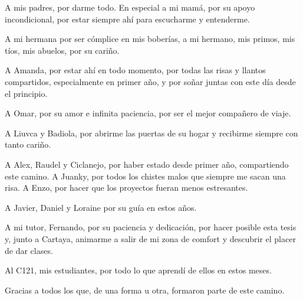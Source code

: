 \begin{acknowledgements}
    A mis padres, por darme todo. En especial a mi mamá, por su apoyo incondicional, por estar siempre ahí para escucharme y entenderme. 
    
    A mi hermana por ser cómplice en mis boberías, a mi hermano, mis primos, mis tíos, mis abuelos, por su cariño.

    A Amanda, por estar ahí en todo momento, por todas las risas y llantos compartidos, especialmente en primer año, y por soñar juntas con este día desde el principio.  

    A Omar, por su amor e infinita paciencia, por ser el mejor compañero de viaje. 
    
    A Liuvca y Badiola, por abrirme las puertas de su hogar y recibirme siempre con tanto cariño.

    A Alex, Raudel y Ciclanejo, por haber estado desde primer año, compartiendo este camino. A Juanky, por todos los chistes malos que siempre me sacan una risa. A Enzo, por hacer que los proyectos fueran menos estresantes.

    A Javier, Daniel y Loraine por su guía en estos años.

    A mi tutor, Fernando, por su paciencia y dedicación, por hacer posible esta tesis y, junto a Cartaya, animarme a salir de mi zona de comfort y descubrir el placer de dar clases.

    Al C121, mis estudiantes, por todo lo que aprendí de ellos en estos meses.

    Gracias a todos los que, de una forma u otra, formaron parte de este camino.
\end{acknowledgements}